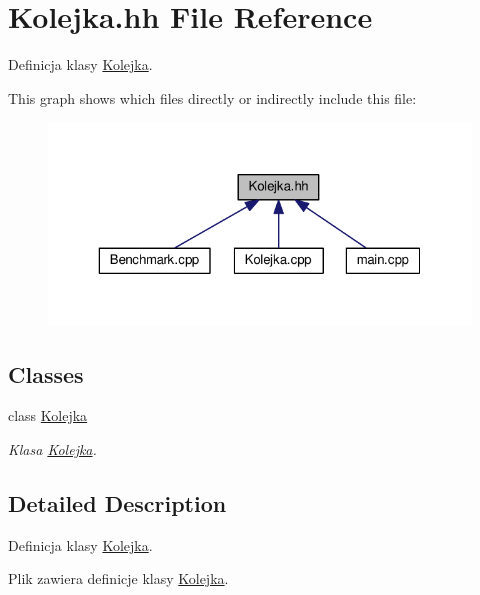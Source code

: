 \hypertarget{a00014}{}\section{Kolejka.\+hh File Reference}
\label{a00014}


Definicja klasy \hyperlink{a00004}{Kolejka}.  


This graph shows which files directly or indirectly include this file\+:\nopagebreak
\begin{figure}[H]
\begin{center}
\leavevmode
\includegraphics[width=325pt]{a00032}
\end{center}
\end{figure}
\subsection*{Classes}
\begin{DoxyCompactItemize}
\item 
class \hyperlink{a00004}{Kolejka}
\begin{DoxyCompactList}\small\item\em Klasa \hyperlink{a00004}{Kolejka}. \end{DoxyCompactList}\end{DoxyCompactItemize}


\subsection{Detailed Description}
Definicja klasy \hyperlink{a00004}{Kolejka}. 

Plik zawiera definicje klasy \hyperlink{a00004}{Kolejka}. 